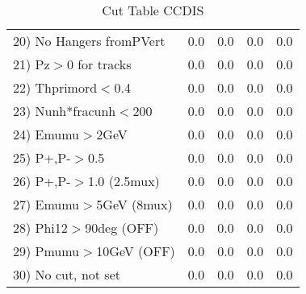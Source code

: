 \begin{table}[h!]
\begin{tabular}{||l||r|r|r|r||}
 20) No Hangers fromPVert &         0.0 &         0.0 &         0.0 &         0.0 \\
 21) Pz$>$0 for tracks    &         0.0 &         0.0 &         0.0 &         0.0 \\
 22) Thprimord$<$0.4      &         0.0 &         0.0 &         0.0 &         0.0 \\
 23) Nunh*fracunh$<$200   &         0.0 &         0.0 &         0.0 &         0.0 \\
 24) Emumu$>$2GeV         &         0.0 &         0.0 &         0.0 &         0.0 \\
 25) P+,P-$>$0.5          &         0.0 &         0.0 &         0.0 &         0.0 \\
 26) P+,P-$>$1.0 (2.5mux) &         0.0 &         0.0 &         0.0 &         0.0 \\
 27) Emumu$>$5GeV  (8mux) &         0.0 &         0.0 &         0.0 &         0.0 \\
 28) Phi12$>$90deg  (OFF) &         0.0 &         0.0 &         0.0 &         0.0 \\
 29) Pmumu$>$10GeV  (OFF) &         0.0 &         0.0 &         0.0 &         0.0 \\
 30) No cut, not set      &         0.0 &         0.0 &         0.0 &         0.0 \\
 \hline
 \hline
 \end{tabular}
 \caption{Cut Table  CCDIS  }
 \label{tab-cut_ccdis}
 \end{table}
